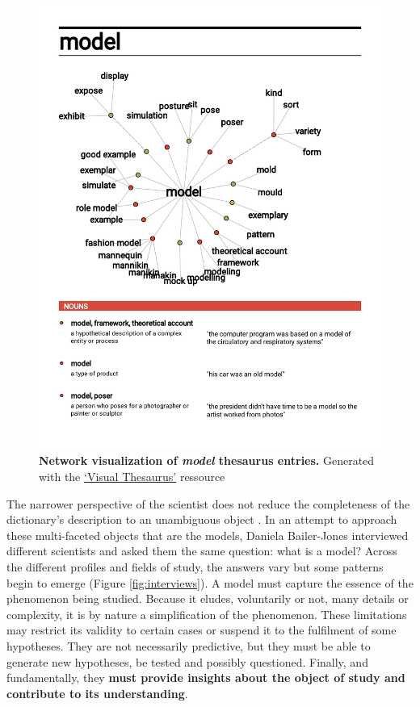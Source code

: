 \documentclass[a4paper,12pt,twoside,onecolumn,openright,final,oldfontcommands]{memoir}
\begin{document}
\begin{figure}

{\centering \includegraphics[width=0.9\linewidth]{fig/visualThesaurus} 

}

\caption[Network visualization of \emph{model} thesaurus entries]{\textbf{Network visualization of
\emph{model} thesaurus entries.} Generated with the
\href{https://www.visualthesaurus.com}{`Visual Thesaurus'} ressource}\label{fig:visual-thesaurus}
\end{figure}





The narrower perspective of the scientist does not reduce the
completeness of the dictionary's description to an unambiguous object
\citep{bailer2002scientists}. In an attempt to approach these
multi-faceted objects that are the models, Daniela Bailer-Jones
interviewed different scientists and asked them the same question: what
is a model? Across the different profiles and fields of study, the
answers vary but some patterns begin to emerge (Figure
\ref{fig:interviews}). A model must capture the essence of the
phenomenon being studied. Because it eludes, voluntarily or not, many
details or complexity, it is by nature a simplification of the
phenomenon. These limitations may restrict its validity to certain cases
or suspend it to the fulfilment of some hypotheses. They are not
necessarily predictive, but they must be able to generate new
hypotheses, be tested and possibly questioned. Finally, and
fundamentally, they \textbf{must provide insights about the object of
study and contribute to its understanding}.
\end{document}
